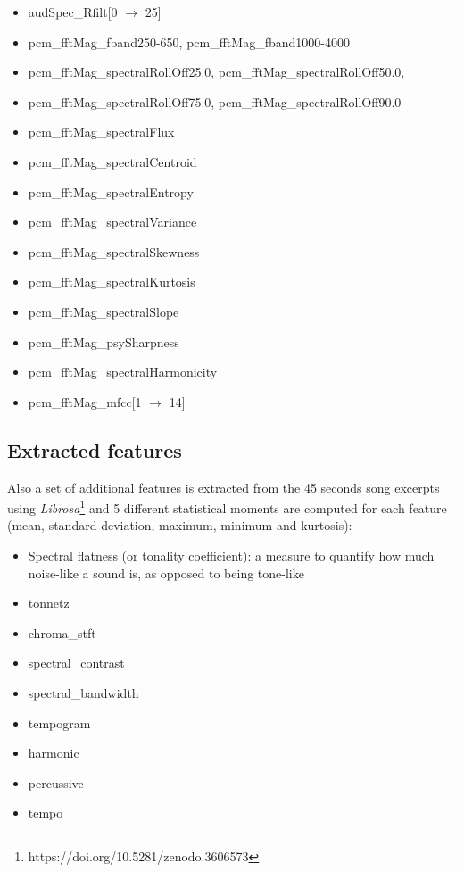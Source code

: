 \begin{itemize}
	\item audSpec\_Rfilt[0 $\rightarrow$ 25]
	\item pcm\_fftMag\_fband250-650, pcm\_fftMag\_fband1000-4000
	\item pcm\_fftMag\_spectralRollOff25.0, pcm\_fftMag\_spectralRollOff50.0, 
	\item pcm\_fftMag\_spectralRollOff75.0, pcm\_fftMag\_spectralRollOff90.0
	\item pcm\_fftMag\_spectralFlux
	\item pcm\_fftMag\_spectralCentroid
	\item pcm\_fftMag\_spectralEntropy
	\item pcm\_fftMag\_spectralVariance
	\item pcm\_fftMag\_spectralSkewness
	\item pcm\_fftMag\_spectralKurtosis
	\item pcm\_fftMag\_spectralSlope
	\item pcm\_fftMag\_psySharpness
	\item pcm\_fftMag\_spectralHarmonicity
	\item pcm\_fftMag\_mfcc[1 $\rightarrow$ 14]
\end{itemize}


\subsection{Extracted features}

Also a set of additional features is extracted  from the 45 seconds song excerpts using \emph{Librosa}\footnote{https://doi.org/10.5281/zenodo.3606573} and 5 different statistical moments are computed for each feature (mean, standard deviation, maximum, minimum and kurtosis):


\begin{itemize}
	\item Spectral flatness (or tonality coefficient): a measure to quantify how much noise-like a sound is, as opposed to being tone-like
	\item tonnetz
	\item chroma\_stft
	\item spectral\_contrast
	\item spectral\_bandwidth
	\item tempogram
	\item harmonic
	\item percussive
	\item tempo
\end{itemize}